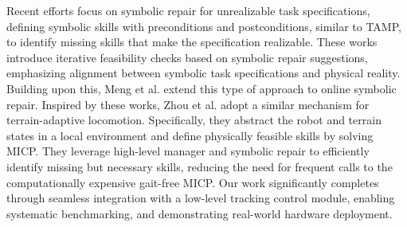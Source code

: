 Recent efforts \citep{pacheck2020finding, pacheck2022physically} focus on symbolic repair for unrealizable task specifications, defining symbolic skills with preconditions and postconditions, similar to TAMP, to identify missing skills that make the specification realizable. These works introduce iterative feasibility checks based on symbolic repair suggestions, emphasizing alignment between symbolic task specifications and physical reality. Building upon this, Meng et al. \citep{meng2024automated} extend this type of approach to online symbolic repair.
Inspired by these works, Zhou et al. \citep{zhou2025physically} adopt a similar mechanism for terrain-adaptive locomotion. Specifically, they abstract the robot and terrain states in a local environment and define physically feasible skills by solving MICP. 
They leverage high-level manager and symbolic repair to efficiently identify missing but necessary skills, reducing the need for frequent calls to the computationally expensive gait-free MICP. Our work significantly completes \citep{zhou2025physically} through seamless integration with a low-level tracking control module, enabling systematic benchmarking, and demonstrating real-world hardware deployment.




